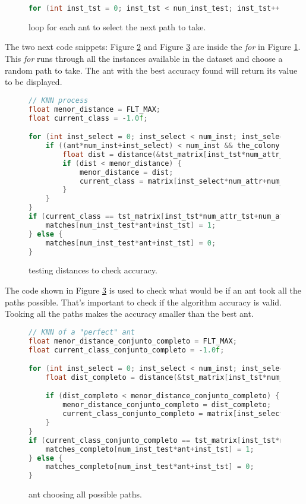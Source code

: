 \begin{figure}[h!]
\begin{lstlisting}[language=c++]
for (int inst_tst = 0; inst_tst < num_inst_test; inst_tst++);
\end{lstlisting}
\caption{loop for each ant to select the next path to take.}
\label{fig:code2}
\end{figure}

The two next code snippets: Figure \ref{fig:code3} and Figure \ref{fig:code4} are inside the \emph{for} in Figure \ref{fig:code2}.
This \emph{for} runs through all the instances available in the dataset and choose
a random path to take. The ant with the best accuracy found will return its value
to be displayed.

\begin{figure}[h!]
\begin{lstlisting}[language=c++]
// KNN process
float menor_distance = FLT_MAX;
float current_class = -1.0f;

for (int inst_select = 0; inst_select < num_inst; inst_select++) {
    if ((ant*num_inst+inst_select) < num_inst && the_colony[ant*num_inst+inst_select] == 1) {
        float dist = distance(&tst_matrix[inst_tst*num_attr_tst], &matrix[inst_select*num_attr], num_attr_tst-1);
        if (dist < menor_distance) {
            menor_distance = dist;
            current_class = matrix[inst_select*num_attr+num_attr-1];
        }
    }
}
if (current_class == tst_matrix[inst_tst*num_attr_tst+num_attr_tst-1]) {
    matches[num_inst_test*ant+inst_tst] = 1;
} else {
    matches[num_inst_test*ant+inst_tst] = 0;
}
\end{lstlisting}
\caption{testing distances to check accuracy.}
\label{fig:code3}
\end{figure}


The code shown in Figure \ref{fig:code4} is used to check what would be if an ant took all the paths possible. That's important to check
if the algorithm accuracy is valid. Tooking all the paths makes the accuracy smaller than the best ant.

\begin{figure}[h!]
\begin{lstlisting}[language=c++]
// KNN of a "perfect" ant
float menor_distance_conjunto_completo = FLT_MAX;
float current_class_conjunto_completo = -1.0f;

for (int inst_select = 0; inst_select < num_inst; inst_select++) {
    float dist_completo = distance(&tst_matrix[inst_tst*num_attr_tst], &matrix[inst_select*num_attr], num_attr_tst-1);

    if (dist_completo < menor_distance_conjunto_completo) {
        menor_distance_conjunto_completo = dist_completo;
        current_class_conjunto_completo = matrix[inst_select*num_attr+num_attr-1];
    }
}
if (current_class_conjunto_completo == tst_matrix[inst_tst*num_attr_tst+num_attr_tst-1]) {
    matches_completo[num_inst_test*ant+inst_tst] = 1;
} else {
    matches_completo[num_inst_test*ant+inst_tst] = 0;
}
\end{lstlisting}
\caption{ant choosing all possible paths.}
\label{fig:code4}
\end{figure}



